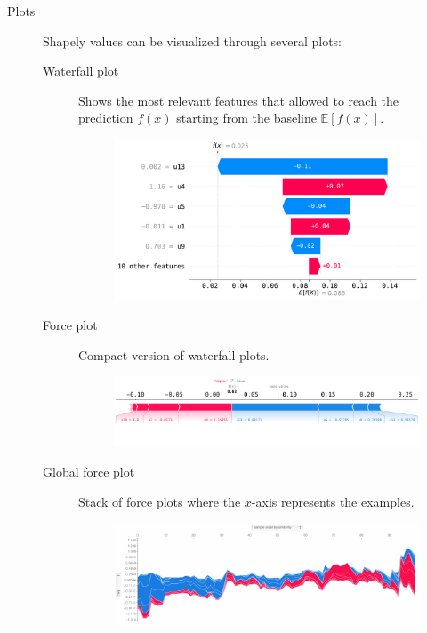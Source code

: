 \begin{description}
\begin{description}
                \item[Plots]
                    Shapely values can be visualized through several plots:

                    \begin{description}
                        \item[Waterfall plot] 
                            Shows the most relevant features that allowed to reach the prediction $f(x)$ starting from the baseline $\mathbb{E}[f(x)]$.
                            \begin{figure}[H]
                                \centering
                                \includegraphics[width=0.6\linewidth]{./img/_biomed_shap_waterfall.pdf}
                            \end{figure}

                        \item[Force plot] 
                            Compact version of waterfall plots.
                            \begin{figure}[H]
                                \raggedleft
                                \includegraphics[width=0.8\linewidth]{./img/_biomed_shap_force.pdf}
                            \end{figure}

                        \item[Global force plot] 
                            Stack of force plots where the $x$-axis represents the examples.
                            \begin{figure}[H]
                                \raggedleft
                                \includegraphics[width=0.8\linewidth]{./img/biomed_shap_global_force.png}
                            \end{figure}


\end{description}
\end{description}
\end{description}

